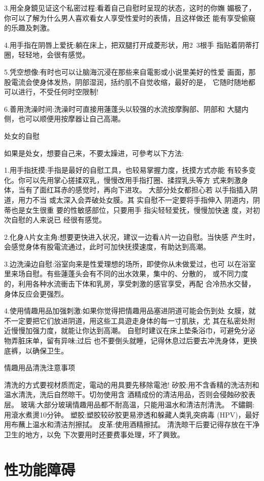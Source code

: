 \documentclass[12pt,UTF8]{ctexbook}
\begin{document}
3.用全身鏡见证这个私密过程:看着自己自慰时呈现的状态，这时的你嫵
媚极了，你可以了解为什么男人喜欢看女人享受性爱时的表情，且这样做还
能有享受偷窺的乐趣及刺激。

4.用手指在阴唇上爱抚:躺在床上，把双腿打开成菱形状，用2~3根手
指贴着阴蒂打圈，轻轻地，会很有感觉。

5.凭空想像:有时也可以让脑海沉浸在那些来自電影或小说里美好的性爱
画面，那股電流会使身体发热，阴部湿润，括约肌不自觉收缩，最好的是，
它随时随地都可以进行，不受任何时空限制!

6.善用洗澡时间:洗澡时可直接用蓮蓬头以较强的水流按摩胸部、阴部和
大腿内侧，也可以顺便用按摩器让自己高潮。

处女的自慰

如果是处女，想要自己来，不要太躁进，可參考以下方法:

1.用手指抚摸:手指是最好的自慰工具，也较易掌握力度，抚摸方式亦能
有较多变化。你可以先用掌心搓揉双乳，慢慢改用手指打圈、揉捏乳头等方
式来刺激身体，当有了面红耳赤的感觉时，再向下进攻。
大部分处女都担心若
以手指插入阴道，用力不当
或太深入会弄破处女膜。其
实自慰不一定要将手指伸入
阴道内，阴蒂也是女生很重
要的性敏感部位，只要用手
指尖轻轻爱抚，慢慢加快速
度，对初次自慰的人来说已
经很有感觉。

2.化身A片女主角:想要更快进入状况，建议一边看A片一边自慰。当快感
产生时，会感觉身体有股電流通过，此时可加快抚摸速度，有助达到高潮。

3.边洗澡边自慰:浴室向来是性爱理想的场所，即使你从未做爱过，也可
以在浴室里来场自慰。有些蓮蓬头会有不同的出水效果，集中的、分散的，
或不同力度的，利用各种水流衝击下体和乳房，享受刺激的感官享受，再配
合冷热水交替，身体反应会更强烈。

4.使用情趣用品加强刺激:如果你觉得把情趣用品塞进阴道可能会伤到处
女膜，就不一定要把它们放进阴道，用这些工具遊走身体的每一寸肌肤，尤
其在私密处附近慢慢加强力度，就能让你达到高潮。
自慰时建议在床上垫条浴巾，可避免分泌物弄脏床单，留有异味;过后
也不要倒头就睡，记得休息过后要去冲洗身体，更换底裤，以确保卫生。

情趣用品清洗注意事项

清洗的方式要视材质而定，電动的用具要先移除電池!
矽胶:用不含香精的洗洁剂和温水清洗，洗后自然晾干。切勿使用含
酒精成份的清洁用品，否则会侵蝕矽胶表层。
玻璃:大部分玻璃情趣用品都不耐高温，只能用温水和清洁剂清洗。
不鏽鋼:用滾水煮燙10分钟。
塑胶:塑胶较矽胶更易滲透和躲藏人类乳突病毒
(HPV)，最好用布蘸上温水和清洁剂擦拭。
皮革:使用酒精擦拭。
清洗晾干后要记得存放在干净卫生的地方，以免
下次要用时还要费事处理，坏了興致。

\part{性功能障碍}
\end{document}
